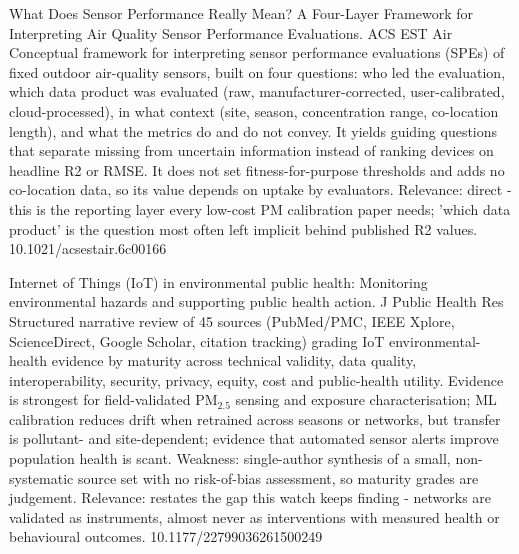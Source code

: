\documentclass[10pt]{article}
\begin{document}
{What Does Sensor Performance Really Mean? A Four-Layer Framework for Interpreting Air Quality Sensor Performance Evaluations.}
{ACS EST Air}
{Conceptual framework for interpreting sensor performance evaluations (SPEs) of fixed outdoor air-quality sensors, built on four questions: who led the evaluation, which data product was evaluated (raw, manufacturer-corrected, user-calibrated, cloud-processed), in what context (site, season, concentration range, co-location length), and what the metrics do and do not convey. It yields guiding questions that separate missing from uncertain information instead of ranking devices on headline R2 or RMSE. It does not set fitness-for-purpose thresholds and adds no co-location data, so its value depends on uptake by evaluators. Relevance: direct - this is the reporting layer every low-cost PM calibration paper needs; 'which data product' is the question most often left implicit behind published R2 values.}
{10.1021/acsestair.6c00166}

{Internet of Things (IoT) in environmental public health: Monitoring environmental hazards and supporting public health action.}
{J Public Health Res}
{Structured narrative review of 45 sources (PubMed/PMC, IEEE Xplore, ScienceDirect, Google Scholar, citation tracking) grading IoT environmental-health evidence by maturity across technical validity, data quality, interoperability, security, privacy, equity, cost and public-health utility. Evidence is strongest for field-validated PM$_{2.5}$ sensing and exposure characterisation; ML calibration reduces drift when retrained across seasons or networks, but transfer is pollutant- and site-dependent; evidence that automated sensor alerts improve population health is scant. Weakness: single-author synthesis of a small, non-systematic source set with no risk-of-bias assessment, so maturity grades are judgement. Relevance: restates the gap this watch keeps finding - networks are validated as instruments, almost never as interventions with measured health or behavioural outcomes.}
{10.1177/22799036261500249}
\end{document}
